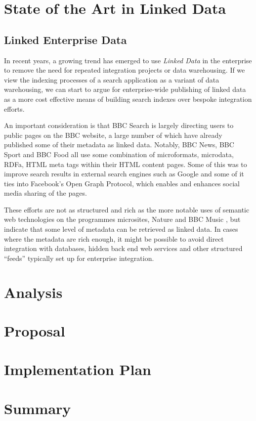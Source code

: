 \documentclass[10pt,a4paper]{report}
\begin{document}
\chapter{State of the Art in Linked Data}

\section{Linked Enterprise Data}

In recent years, a growing trend has emerged to use
\emph{Linked Data} in the enterprise to remove the need
for repeated integration projects or data warehousing.
\cite{allemang2010semantic} If we view the indexing processes
of a search application as a variant of data warehousing,
we can start to argue for enterprise-wide publishing of
linked data as a more cost effective means of building search
indexes over bespoke integration efforts.

An important consideration is that BBC Search is largely directing
users to public pages on the BBC website, a large number of which have
already published some of their metadata as linked data. Notably, BBC News,
BBC Sport and BBC Food all use some combination
of microformats, microdata, RDFa, HTML meta tags within their HTML content
pages. Some of this was to improve search results in external search engines
such as Google and some of it ties into Facebook's Open Graph Protocol, which
enables and enhances social media sharing of the pages.

These efforts are not as structured and rich as the more notable uses
of semantic web technologies on the programmes microsites, Nature and BBC
Music \cite{}, but indicate that some level of metadata can be retrieved
as linked data. In cases where the metadata are rich enough, it might be
possible to avoid direct integration with databases, hidden back end
web services and other structured ``feeds'' typically set up for enterprise
integration.

\chapter{Analysis}

\chapter{Proposal}

\chapter{Implementation Plan}

\chapter{Summary}



\end{document}
